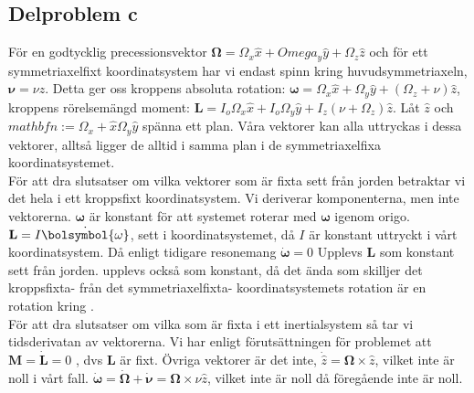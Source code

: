 \documentclass[12pt,a4paper]{article}
\begin{document}
\subsection{Delproblem c}
För en godtycklig precessionsvektor $\boldsymbol{\Omega}= \Omega_x \hat{x} + Omega_y \hat{y} + \Omega_z \hat{z}$ och för ett symmetriaxelfixt koordinatsystem har vi endast spinn kring huvudsymmetriaxeln, $\boldsymbol{\nu}=\nu \hat{z}$. Detta ger oss kroppens absoluta rotation: $\boldsymbol{\omega}=\Omega_x \hat{x} + \Omega_y \hat{y} + (\Omega_z + \nu )\hat{z}$, kroppens rörelsemängd moment: $\mathbf{L}=I_o \Omega_x \hat{x} + I_o \Omega_y \hat{y} + I_z (\nu + \Omega_z) \hat{z}$. Låt $\hat{z}$ och $mathbf{n} := \Omega_x + \hat{x} \Omega_y \hat{y}$ spänna ett plan. Våra vektorer kan alla uttryckas i dessa vektorer, alltså ligger de alltid i samma plan i de symmetriaxelfixa koordinatsystemet. \\
För att dra slutsatser om vilka vektorer som är fixta sett från jorden betraktar vi det hela i ett kroppsfixt koordinatsystem. Vi deriverar komponenterna, men inte vektorerna. $\boldsymbol{\omega}$ är konstant för att systemet roterar med $\boldsymbol{\omega}$ igenom origo. $\mathbf{L}=I\dot{\bolsymbol{\omega}}$, sett i koordinatsystemet, då $I$ är konstant uttryckt i vårt koordinatsystem. Då enligt tidigare resonemang $\dot{\boldsymbol{\omega}}=0$ Upplevs $\mathbf{L}$ som konstant sett från jorden.  upplevs också som konstant, då det ända som skilljer det kroppsfixta- från det symmetriaxelfixta- koordinatsystemets rotation är en rotation kring .\\

För att dra slutsatser om vilka som är fixta i ett inertialsystem så tar vi tidsderivatan av vektorerna. Vi har enligt förutsättningen för problemet att $\mathbf{M} = \dot{\mathbf{L}}=0$ , dvs $\mathbf{L}$ är fixt. Övriga vektorer är det inte, $\dot{\hat{z}}=\boldsymbol{\Omega} \times \hat{z}$, vilket inte är noll i vårt fall. $\dot{\boldsymbol{\omega}} = \dot{\boldsymbol{\Omega}}+\dot{\boldsymbol{\nu}} = \boldsymbol{\Omega} \times \nu \hat{z}$, vilket inte är noll då föregående inte är noll.
\end{document}
